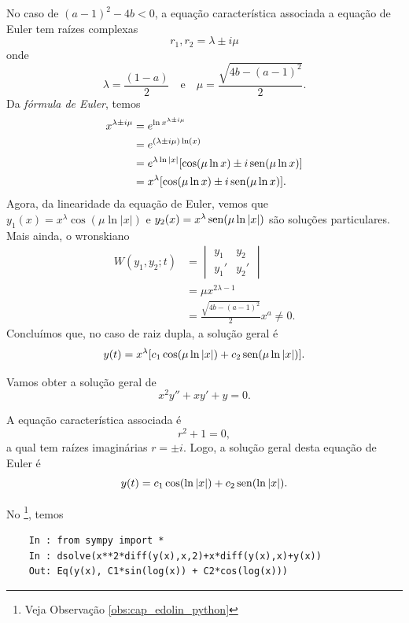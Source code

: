 No caso de $(a-1)^2-4b < 0$, a equação característica associada a equação de Euler tem raízes complexas
\begin{equation}
  r_1,r_2 = \lambda \pm i\mu
\end{equation}
onde
\begin{equation}
  \lambda = \frac{(1-a)}{2}\quad\text{e}\quad \mu = \frac{\sqrt{4b - (a-1)^2}}{2}.
\end{equation}
Da \emph{fórmula de Euler}, temos
\begin{align}
  x^{\lambda\pm i\mu} &= e^{\ln x^{\lambda \pm i\mu}} \\
  &= e^{(\lambda \pm i\mu)\ln(x)} \\
  &= e^{\lambda\ln|x|}[\cos(\mu\ln x) \pm i\operatorname{sen}(\mu\ln x)] \\
  &= x^\lambda[\cos(\mu\ln x) \pm i\operatorname{sen}(\mu\ln x)].
\end{align}
Agora, da linearidade da equação de Euler, vemos que $y_1(x) = x^\lambda\cos(\mu\ln|x|)$ e $y_2(x) = x^\lambda\operatorname{sen}(\mu\ln|x|)$ são soluções particulares. Mais ainda, o wronskiano
\begin{align}
  W(y_1,y_2;t) &=
  \begin{vmatrix}
    y_1 & y_2 \\
    y_1' & y_2'
  \end{vmatrix} \\
  &= \mu x^{2\lambda-1} \\
  &= \frac{\sqrt{4b-(a-1)^2}}{2}x^a \neq 0.
\end{align}
Concluímos que, no caso de raiz dupla, a solução geral é
\begin{equation}
  y(t) = x^\lambda[c_1\cos(\mu\ln|x|) + c_2\operatorname{sen}(\mu\ln|x|)].
\end{equation}

\begin{ex}
  Vamos obter a solução geral de
  \begin{equation}
    x^2y'' + xy' + y = 0.
  \end{equation}

  A equação característica associada é
  \begin{equation}
    r^2 + 1 = 0,
  \end{equation}
  a qual tem raízes imaginárias $r = \pm i$. Logo, a solução geral desta equação de Euler é
  \begin{equation}
    y(t) = c_1\cos(\ln|x|) + c_2\operatorname{sen}(\ln|x|).
  \end{equation}

  \ifispython
  No \python\footnote{Veja Observação \ref{obs:cap_edolin_python}}, temos
  \begin{lstlisting}
    In : from sympy import *
    In : dsolve(x**2*diff(y(x),x,2)+x*diff(y(x),x)+y(x))
    Out: Eq(y(x), C1*sin(log(x)) + C2*cos(log(x)))
  \end{lstlisting}
  \fi    
\end{ex}

